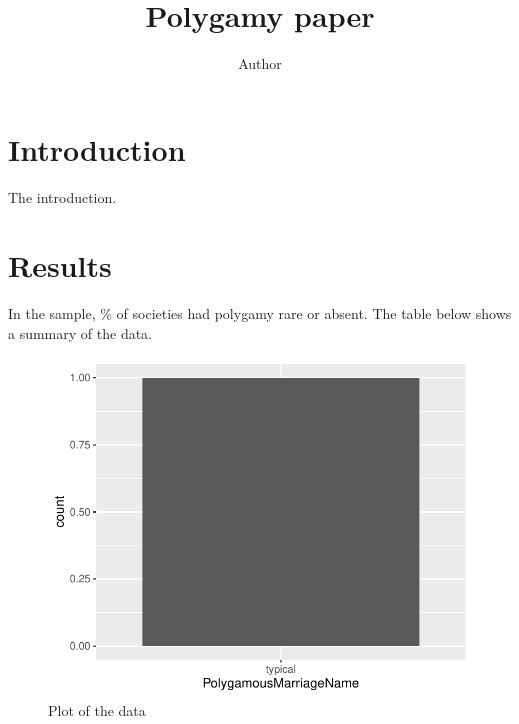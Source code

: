 \documentclass[12pt,a4paper]{article}
\author{Author}
\title{Polygamy paper}
\date{}
\begin{document}
\maketitle

\section{Introduction}

The introduction.

\section{Results}

In the sample, \unskip\%  of societies had polygamy rare or absent. The table below shows a summary of the data.



\begin{figure}
\includegraphics[width=\linewidth]{../results/PolyPlot.pdf}
\caption{Plot of the data}
\end{figure}
\end{document}
